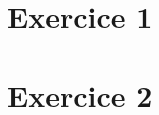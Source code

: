 \documentclass{article}
\begin{document}
	\maketitle
	\section{Exercice 1}
	
	\section{Exercice 2}
	
	
	\newpage
	
\end{document}
